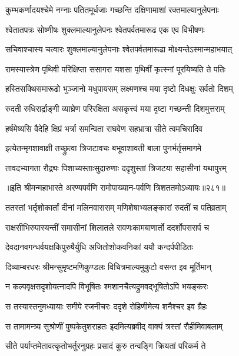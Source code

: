 \twolineshloka
{कुम्भकर्णादयश्चेमे नग्नाः पतितमूर्धजाः}
{गच्छन्ति दक्षिणामाशां रक्तमाल्यानुलेपनाः}


\twolineshloka
{श्वेतातपत्रः सोष्णीषः शुक्लमाल्यानुलेपनः}
{श्वेतपर्वतमारूढ एक एव विभीषणः}


\twolineshloka
{सचिवाश्चास्य चत्वारः शुक्लमाल्यानुलेपनाः}
{श्वेतपर्वतमारूढा मोक्ष्यन्तेऽस्मान्महाभयात्}


\twolineshloka
{रामस्यास्त्रेण पृथिवी परिक्षिप्ता ससागरा}
{यशसा पृथिवीं कृत्स्नां पूरयिष्यति ते पतिः}


\twolineshloka
{हस्तिसक्थिसमारूढो भुञ्जानो मधुपायसम्}
{लक्ष्मणश्च मया दृष्टो दिधक्षुः सर्वतो दिशम्}


\twolineshloka
{रुदती रुधिरार्द्राङ्गी व्याघ्रेण परिरक्षिता}
{असकृत्त्वं मया दृष्टा गच्छन्ती दिशमुत्तराम्}


\twolineshloka
{हर्षमेष्यसि वैदेहि क्षिप्रं भर्त्रा समन्विता}
{राघवेण सहभ्रात्रा सीते त्वमचिरादिव}


\twolineshloka
{इत्येतन्मृगशावाक्षी तच्छ्रुत्वा त्रिजटावचः}
{बभूवाशावती बाला पुनर्भर्तृसमागमे}


\twolineshloka
{तावदभ्यागता रौद्र्यः पिशाच्यस्ताःसुदारुणाः}
{ददृशुस्तां त्रिजटया सहासीनां यथापुरम्}


॥इति श्रीमन्महाभारते अरण्यपर्वणि रामोपाख्यान-पर्वणि त्रिशततमोऽध्यायः॥२८१॥

\storymeta

\resetShloka



\twolineshloka
{ततस्तां भर्तृशोकार्तां दीनां मलिनवाससम्}
{मणिशेषाभ्यलङ्कारां रुदतीं च पतिव्रताम्}


\twolineshloka
{राक्षसीभिरुपास्यन्तीं समासीनां शिलातले}
{रावणःकामबाणार्तो ददर्शोपससर्प च}


\twolineshloka
{देवदानवगन्धर्वयक्षकिपुरुषैर्युधि}
{अजितोशोकवनिकां ययौ कन्दर्पपीडितः}


\twolineshloka
{दिव्याम्बरधरः श्रीमन्सुमृष्टमणिकुण्डलः}
{विचित्रमाल्यमुकुटो वसन्त इव मूर्तिमान्}


\twolineshloka
{न कल्पवृक्षसदृशोयत्नादपि विभूषितः}
{श्मशानचैत्यद्रुमवद्भूषितोऽपि भयङ्करः}


\twolineshloka
{स तस्यास्तनुमध्यायाः समीपे रजनीचरः}
{ददृशे रोहिणीमेत्य शनैश्चर इव ग्रैहः}


\twolineshloka
{स तामामन्त्र्य सुश्रोणीं पुष्पकेतुशराहतः}
{इदमित्यब्रवीद् वाक्यं त्रस्तां रौहीमिवाबलाम्}


\twolineshloka
{सीते पर्याप्तमेतावत्कृतोभर्तुरनुग्रहः}
{प्रसादं कुरु तन्वङ्गि क्रियतां परिकर्म ते}


